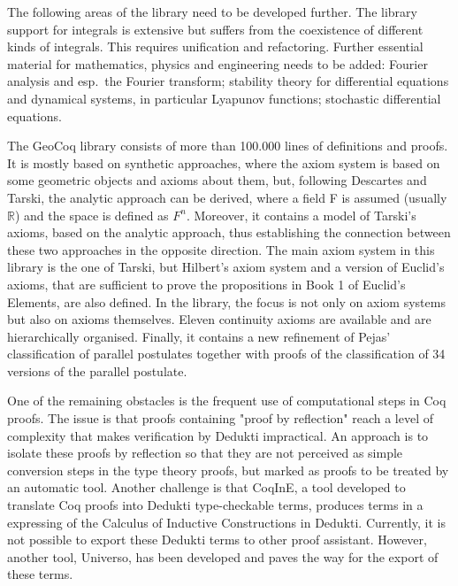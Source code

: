 \begin{workpackage}[id=libraries,type=RTD,wphases=1-48,
  short={Large libraries},%
  title={Large libraries},
  activity=na,
  lead=Tum,
  StrRM=18,
  ChaRM=12,
  TumRM=27]
\begin{tasklist}
\begin{task}[
  id=isaAnalysisProb,
  title=The Isabelle Analysis \& Probability Theory library,
  shorttitle=Isa. A\&P,
  lead=Tum,
  TumRM=24,
  wphases=1-24]
The following areas of the library need to be developed further. The
library support for integrals is extensive but suffers from the
coexistence of different kinds of integrals. This requires unification
and refactoring. Further essential material for mathematics, physics
and engineering needs to be added: Fourier
analysis and esp.\ the Fourier transform; stability theory for
differential equations and dynamical systems, in particular Lyapunov
functions; stochastic differential equations.
\end{task}

\begin{task}[
  id=geocoq,
  title=The GeoCoq library,
  shorttitle=GeoCoq,
  lead=Str,
  StrRM=18,
  wphases=1-18]
%
The GeoCoq library consists of more than 100.000 lines of definitions
and proofs. It is mostly based on synthetic approaches, where the
axiom system is based on some geometric objects and axioms about them,
but, following Descartes and Tarski, the analytic approach can be
derived, where a field F is assumed (usually $\mathbb{R}$) and the space is
defined as $F^n$. Moreover, it contains a model of Tarski's axioms,
based on the analytic approach, thus establishing the connection
between these two approaches in the opposite direction. The main axiom
system in this library is the one of Tarski, but Hilbert's axiom
system and a version of Euclid's axioms, that are sufficient to prove the
propositions in Book 1 of Euclid's Elements, are also defined. In the
library, the focus is not only on axiom systems but also on axioms
themselves. Eleven continuity axioms are available and are
hierarchically organised. Finally, it contains a new refinement of
Pejas’ classification of parallel postulates together with proofs of
the classification of 34 versions of the parallel postulate.

One of the remaining obstacles is the frequent use of computational steps in Coq proofs. The issue is that proofs containing "proof by reflection" reach a level of complexity that makes verification by Dedukti impractical. An approach is to isolate these proofs by reflection so that they are not perceived as simple conversion steps in the type theory proofs, but marked as proofs to be treated by an automatic tool. Another challenge is that CoqInE, a tool developed to translate Coq proofs into Dedukti type-checkable terms, produces terms in a expressing of the Calculus of Inductive Constructions in Dedukti. Currently, it is not possible to export these Dedukti terms to other proof assistant. However, another tool, Universo, has been developed and paves the way for the export of these terms.
\end{task}


\end{tasklist}
\end{workpackage}
